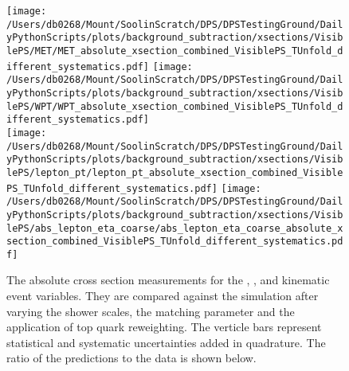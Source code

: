 \begin{figure}[hp]
	\centering
	\texttt{[image: /Users/db0268/Mount/SoolinScratch/DPS/DPSTestingGround/DailyPythonScripts/plots/background\_subtraction/xsections/VisiblePS/MET/MET\_absolute\_xsection\_combined\_VisiblePS\_TUnfold\_different\_systematics.pdf]}
	\texttt{[image: /Users/db0268/Mount/SoolinScratch/DPS/DPSTestingGround/DailyPythonScripts/plots/background\_subtraction/xsections/VisiblePS/WPT/WPT\_absolute\_xsection\_combined\_VisiblePS\_TUnfold\_different\_systematics.pdf]} \\
	\texttt{[image: /Users/db0268/Mount/SoolinScratch/DPS/DPSTestingGround/DailyPythonScripts/plots/background\_subtraction/xsections/VisiblePS/lepton\_pt/lepton\_pt\_absolute\_xsection\_combined\_VisiblePS\_TUnfold\_different\_systematics.pdf]} 
	\texttt{[image: /Users/db0268/Mount/SoolinScratch/DPS/DPSTestingGround/DailyPythonScripts/plots/background\_subtraction/xsections/VisiblePS/abs\_lepton\_eta\_coarse/abs\_lepton\_eta\_coarse\_absolute\_xsection\_combined\_VisiblePS\_TUnfold\_different\_systematics.pdf]}
 	\caption[The absolute cross section measurements for the \ptmiss{}, \WPT{}, \LPT{} and \LETA{} kinematic event variables. They are compared against the \powhegpythia{} simulation after varying the shower scales, the \hdamp{} matching parameter and the application of top quark \pt{} reweighting. The verticle bars represent statistical and systematic uncertainties added in quadrature. The ratio of the predictions to the data is shown below.]{The absolute cross section measurements for the \ptmiss{}, \WPT{}, \LPT{} and \LETA{} kinematic event variables. They are compared against the \powhegpythia{} simulation after varying the shower scales, the \hdamp{} matching parameter and the application of top quark \pt{} reweighting. The verticle bars represent statistical and systematic uncertainties added in quadrature. The ratio of the predictions to the data is shown below.}
	\label{fig:combXSecSysAbs2}
\end{figure}